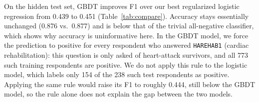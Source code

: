 \documentclass[10pt,conference,compsocconf]{IEEEtran}
\begin{document}
On the hidden test set, GBDT improves F1 over our best regularized logistic
regression from 0.439 to 0.451 (Table~\ref{tab:compare}). Accuracy stays
essentially unchanged (0.876 vs.\ 0.877) and is below that of the trivial
all-negative classifier, which shows why accuracy is uninformative here.
In the GBDT model, we force the prediction to positive for every respondent
who answered \texttt{HAREHAB1} (cardiac rehabilitation): this question is only asked of
heart-attack survivors, and all 773 such training respondents are positive.
We do not apply this rule to the logistic model, which labels only 154 of the
238 such test respondents as positive. Applying the same rule would raise its
F1 to roughly 0.444, still below the GBDT model, so the rule alone does not explain the
gap between the two models.



\end{document}

